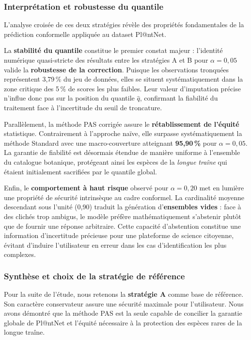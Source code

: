 \documentclass[12pt,a4paper]{article}
\begin{document}
\subsubsection{Interprétation et robustesse du quantile}

L'analyse croisée de ces deux stratégies révèle des propriétés fondamentales de la prédiction conformelle appliquée au dataset Pl@ntNet. 

La \textbf{stabilité du quantile} constitue le premier constat majeur : l'identité numérique quasi-stricte des résultats entre les stratégies A et B pour $\alpha=0{,}05$ valide la \textbf{robustesse de la correction}. Puisque les observations tronquées représentent 3,79\,\% du jeu de données, elles se situent systématiquement dans la zone critique des 5\,\% de scores les plus faibles. Leur valeur d'imputation précise n'influe donc pas sur la position du quantile $\hat{q}$, confirmant la fiabilité du traitement face à l'incertitude du seuil de troncature.

Parallèlement, la méthode PAS corrigée assure le \textbf{rétablissement de l'équité} statistique. Contrairement à l'approche naïve, elle surpasse systématiquement la méthode Standard avec une macro-couverture atteignant \textbf{95,90\,\%} pour $\alpha=0{,}05$. La garantie de fiabilité est désormais étendue de manière uniforme à l'ensemble du catalogue botanique, protégeant ainsi les espèces de la \textit{longue traîne} qui étaient initialement sacrifiées par le quantile global.

Enfin, le \textbf{comportement à haut risque} observé pour $\alpha=0{,}20$ met en lumière une propriété de sécurité intrinsèque au cadre conformel. La cardinalité moyenne descendant sous l'unité (0,90) traduit la génération d'\textbf{ensembles vides} : face à des clichés trop ambigus, le modèle préfère mathématiquement s'abstenir plutôt que de fournir une réponse arbitraire. Cette capacité d'abstention constitue une information d'incertitude précieuse pour une plateforme de science citoyenne, évitant d'induire l'utilisateur en erreur dans les cas d'identification les plus complexes.




\subsubsection{Synthèse et choix de la stratégie de référence}

Pour la suite de l'étude, nous retenons la \textbf{stratégie A} comme base de référence. Son caractère conservateur assure une sécurité maximale pour l'utilisateur. Nous avons démontré que la méthode PAS est la seule capable de concilier la garantie globale de Pl@ntNet et l'équité nécessaire à la protection des espèces rares de la longue traîne.
\end{document}
